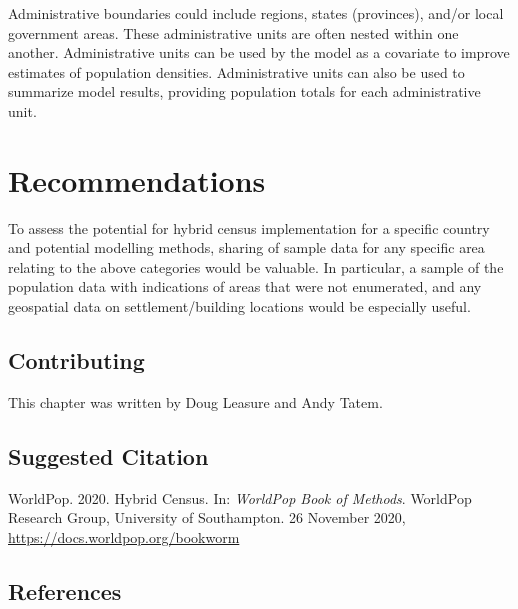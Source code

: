 \documentclass[]{book}
\begin{document}
Administrative boundaries could include regions, states (provinces),
and/or local government areas. These administrative units are often
nested within one another. Administrative units can be used by the model
as a covariate to improve estimates of population densities.
Administrative units can also be used to summarize model results,
providing population totals for each administrative unit.

\section{Recommendations}\label{recommendations}

To assess the potential for hybrid census implementation for a specific
country and potential modelling methods, sharing of sample data for any
specific area relating to the above categories would be valuable. In
particular, a sample of the population data with indications of areas
that were not enumerated, and any geospatial data on settlement/building
locations would be especially useful.

\subsection*{Contributing}\label{contributing-10}

This chapter was written by Doug Leasure and Andy Tatem.

\subsection*{Suggested Citation}\label{suggested-citation-10}

WorldPop. 2020. Hybrid Census. In: \emph{WorldPop Book of Methods}.
WorldPop Research Group, University of Southampton. 26 November 2020,
\url{https://docs.worldpop.org/bookworm}

\subsection*{References}\label{references}


\end{document}
